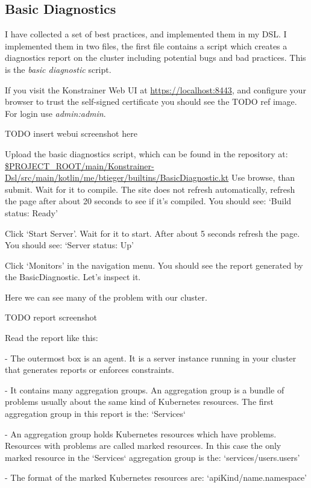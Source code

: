 \subsection{Basic Diagnostics}

I have collected a set of best practices, and implemented them in my DSL. I implemented them in two files, the first file contains a script which creates a diagnostics report on the cluster including potential bugs and bad practices. This is the \emph{basic diagnostic} script.

If you visit the Konstrainer Web UI at \url{https://localhost:8443}, and configure your browser to trust the self-signed certificate you should see the TODO ref image. For login use \emph{admin:admin}. 

TODO insert webui screenshot here


Upload the basic diagnostics script, which can be found in the repository at:
\url{$PROJECT_ROOT/main/Konstrainer-Dsl/src/main/kotlin/me/btieger/builtins/BasicDiagnostic.kt}
Use browse, than submit. Wait for it to compile. The site does not refresh automatically, refresh the page after about 20 seconds to see if it's compiled. You should see: `Build status: Ready'

Click `Start Server'. Wait for it to start. After about 5 seconds refresh the page. You should see: `Server status: Up'

Click `Monitors' in the navigation menu. You should see the report generated by the BasicDiagnostic. Let's inspect it.

Here we can see many of the problem with our cluster.

TODO report screenshot

Read the report like this:

- The outermost box is an agent. It is a server instance running in your cluster that generates reports or enforces constraints.

- It contains many aggregation groups. An aggregation group is a bundle of problems usually about the same kind of Kubernetes resources. The first aggregation group in this report is the: `Services`

  - An aggregation group holds Kubernetes resources which have problems. Resources with problems are called marked resources. In this case the only marked resource in the `Services` aggregation group is the: `services/users.users'

  - The format of the marked Kubernetes resources are: `apiKind/name.namespace'


